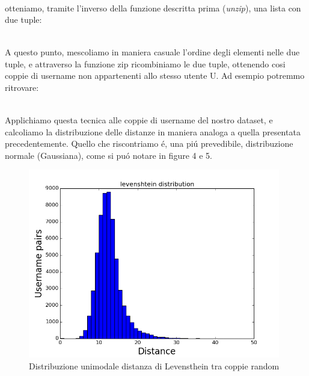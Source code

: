 \begin{gather*}
  [(U\textsubscript{1}u\textsubscript{1},U\textsubscript{1}u\textsubscript{2}), (U\textsubscript{2}u\textsubscript{1},U\textsubscript{2}u\textsubscript{2}), (U\textsubscript{3}u\textsubscript{1},U\textsubscript{3}u\textsubscript{2})]
\end{gather*}

otteniamo, tramite l'inverso della funzione descritta prima (\textit{unzip}), una lista con due tuple:

\begin{gather*}
  [(U\textsubscript{1}u\textsubscript{1},U\textsubscript{2}u\textsubscript{1}, U\textsubscript{3}u\textsubscript{1}),(U\textsubscript{1}u\textsubscript{2}, U\textsubscript{2}u\textsubscript{2},U\textsubscript{3}u\textsubscript{2})]
\end{gather*}

A questo punto, mescoliamo in maniera casuale l'ordine degli elementi nelle due tuple, e attraverso la funzione zip ricombiniamo le due tuple, ottenendo cosi coppie di username non appartenenti allo stesso utente U. Ad esempio potremmo ritrovare:

\begin{gather*}
  [(U\textsubscript{1}u\textsubscript{1},U\textsubscript{2}u\textsubscript{2}), (U\textsubscript{2}u\textsubscript{1},U\textsubscript{3}u\textsubscript{2}), (U\textsubscript{3}u\textsubscript{1},U\textsubscript{1}u\textsubscript{2})]
\end{gather*}


Applichiamo questa tecnica alle coppie di username del nostro dataset, e calcoliamo la distribuzione delle distanze in maniera analoga a quella presentata precedentemente. Quello che riscontriamo é, una piú prevedibile, distribuzione normale (Gaussiana), come si puó notare in figure 4 e 5.

\begin{figure}[bp!]
\centering
\includegraphics[width=110mm]{chapters/distanceplot/random_levenshtein_distribution.png}
\caption{Distribuzione unimodale distanza di Levensthein tra coppie random  \label{overflow}}
\end{figure}

